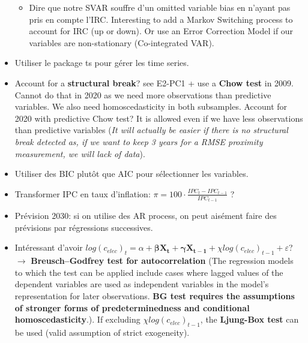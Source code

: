 \begin{itemize}
\begin{itemize}
    \item Dire que notre SVAR souffre d'un omitted variable bias en n'ayant pas pris en compte l'IRC. Interesting to add a Markov Switching process to account for IRC (up or down). Or use an Error Correction Model if our variables are non-stationary (Co-integrated VAR).
\end{itemize}
\item Utiliser le package ts pour gérer les time series.
\item Account for a \textbf{structural break}? see E2-PC1 + use a \textbf{Chow test} in 2009. Cannot do that in 2020 as we need more observations than predictive variables. We also need homoscedasticity in both subsamples. Account for 2020 with predictive Chow test? It is allowed even if we have less observations than predictive variables (\textit{It will actually be easier if there is no structural break detected as, if we want to keep 3 years for a RMSE proximity measurement, we will lack of data}).
\item Utiliser des BIC plutôt que AIC pour sélectionner les variables.
\item Transformer IPC en taux d'inflation: $\pi = 100 \cdot \frac{IPC_t - IPC_{t-1}}{IPC_{t-1}}$ ?
\item Prévision 2030: si on utilise des AR process, on peut aisément faire des prévisions par régressions successives.
\item Intéressant d'avoir $log(c_{elec})_t = \alpha + \boldsymbol{\beta X_t} + \boldsymbol{\gamma X_{t-1}} + {\chi log(c_{elec})_{t-1}} + \varepsilon$? $\to$ \textbf{Breusch–Godfrey test for autocorrelation} (The regression models to which the test can be applied include cases where lagged values of the dependent variables are used as independent variables in the model's representation for later observations. \textbf{BG test requires the assumptions of stronger forms of predeterminedness and conditional homoscedasticity}.). If excluding $\chi log(c_{elec})_{t-1}$, the \textbf{Ljung-Box test} can be used (valid assumption of strict exogeneity).
\end{itemize}

